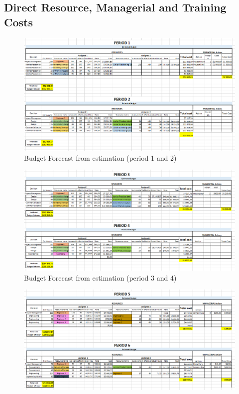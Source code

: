 \begin{appendices}
\begin{landscape}

\subsection{Direct Resource, Managerial and Training Costs}

\begin{figure}[H]
\includegraphics[scale=0.75]{budget_forecast_est_12.PNG}
\caption{Budget Forecast from estimation (period 1 and 2)}
\end{figure}
\begin{figure}[H]
\includegraphics[scale=0.8]{budget_forecast_est_34.PNG}
\caption{Budget Forecast from estimation (period 3 and 4)}
\end{figure}
\begin{figure}[H]
\includegraphics[scale=0.8]{budget_forecast_est_56.PNG}

\end{figure}
\end{landscape}
\end{appendices}
